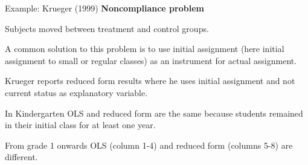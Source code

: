 \documentclass{beamer}
\begin{document}
\begin{frame}{Example: Krueger (1999)}
\textbf{Noncompliance problem}\medskip

Subjects moved between treatment and control groups.\medskip

A common solution to this problem is to use initial assignment (here initial assignment to small or regular classes) as an instrument for actual assignment.\medskip

Krueger reports reduced form results where he uses initial assignment and not current status as explanatory variable.\medskip

In Kindergarten OLS and reduced form are the same because students remained in their initial class for at least one year.\medskip

From grade 1 onwards OLS (column 1-4) and reduced form (columns
5-8) are different.
\end{frame}


%
%
\end{document}
